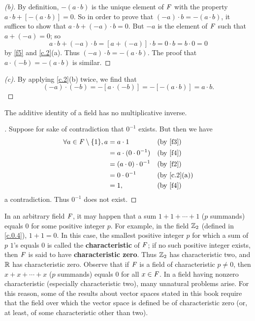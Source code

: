 \begin{proof}[(b)]
  By definition, \(-(a \cdot b)\) is the unique element of \(\mathit{F}\) with the property \(a \cdot b + [-(a \cdot b)] = 0\).
  So in order to prove that \((-a) \cdot b = -(a \cdot b)\), it suffices to show that \(a \cdot b + (-a) \cdot b = 0\).
  But \(-a\) is the element of \(\mathit{F}\) such that \(a + (-a) = 0\);
  so
  \[
    a \cdot b + (-a) \cdot b = [a + (-a)] \cdot b = 0 \cdot b = b  \cdot 0 = 0
  \]
  by \ref{f5} and \cref{c.2}(a).
  Thus \((-a) \cdot b = -(a \cdot b)\).
  The proof that \(a \cdot (-b) = -(a \cdot b)\) is similar.
\end{proof}

\begin{proof}[(c)]
  By applying \cref{c.2}(b) twice, we find that
  \[
    (-a) \cdot (-b) = -[a \cdot (-b)] = -[-(a \cdot b)] = a \cdot b.
  \]
\end{proof}

\begin{cor}\label{c.0.8}
  The additive identity of a field has no multiplicative inverse.
\end{cor}

\begin{proof}[]
  Suppose for sake of contradiction that \(0^{-1}\) exists.
  But then we have
  \begin{align*}
    \forall a \in \F \setminus \set{1}, a & = a \cdot 1                &  & \text{(by \ref{f3})} \\
                                          & = a \cdot (0 \cdot 0^{-1}) &  & \text{(by \ref{f4})} \\
                                          & = (a \cdot 0) \cdot 0^{-1} &  & \text{(by \ref{f2})} \\
                                          & = 0 \cdot 0^{-1}           &  & \by{c.2}[a]          \\
                                          & = 1,                       &  & \text{(by \ref{f4})}
  \end{align*}
  a contradiction.
  Thus \(0^{-1}\) does not exist.
\end{proof}

\begin{defn}\label{c.0.9}
  In an arbitrary field \(\mathit{F}\), it may happen that a sum \(1 + 1 + \cdots + 1\) (\(p\) summands) equals \(0\) for some positive integer \(p\).
  For example, in the field \(\mathbb{Z}_2\) (defined in \cref{c.0.4}), \(1 + 1 = 0\).
  In this case, the smallest positive integer \(p\) for which a sum of \(p\) \(1\)'s equals \(0\) is called the \textbf{characteristic} of \(\mathit{F}\);
  if no such positive integer exists, then \(\mathit{F}\) is said to have \textbf{characteristic zero}.
  Thus \(\mathbb{Z}_2\) has characteristic two, and \(\mathbb{R}\) has characteristic zero.
  Observe that if \(\mathit{F}\) is a field of characteristic \(p \neq 0\), then \(x + x + \cdots + x\) (\(p\) summands) equals \(0\) for all \(x \in \mathit{F}\).
  In a field having nonzero characteristic (especially characteristic two), many unnatural problems arise.
  For this reason, some of the results about vector spaces stated in this book require that the field over which the vector space is defined be of characteristic zero (or, at least, of some characteristic other than two).
\end{defn}
